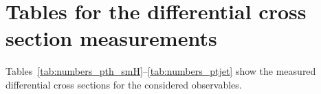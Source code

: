 \clearpage
\section{Tables for the differential cross section measurements}
\label{app:tables}

Tables~\ref{tab:numbers_pth_smH}--\ref{tab:numbers_ptjet} show the measured differential cross sections for the considered observables.

\begin{table}[h!]
    \centering
    \label{tab:numbers_pth_smH}
    \end{table}

\begin{table}[h!]
    \centering
    \label{tab:numbers_pth_ggH}
    \end{table}


\begin{table}[h!]
    \centering
    \label{tab:numbers_njets}
    \begin{tabular}{|l|c|c|c|c|c|}
    \hline
     \\
    \hline
    \end{tabular}
    \end{table}

\begin{table}[h!]
    \centering
    \label{tab:numbers_absy}
    \begin{tabular}{|l|c|c|c|c|c|c|}
    \hline
     \\
    \hline
    \end{tabular}
    \end{table}

